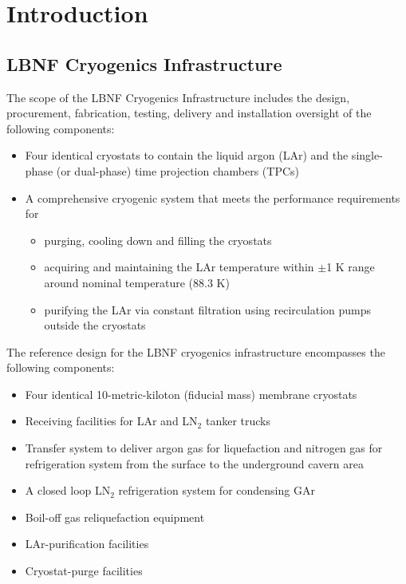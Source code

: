 \chapter{Introduction}
\label{ch:cryo-intro}

\section{LBNF Cryogenics Infrastructure}
\label{sec:cryo-intro-fd}

The scope of the LBNF Cryogenics Infrastructure includes the design, 
procurement, fabrication, testing, delivery and installation
oversight of the following components:
\begin{itemize}
 \item {Four identical cryostats to contain the liquid argon (LAr) 
       and the single-phase (or dual-phase) time projection chambers (TPCs)} 
 \item {A comprehensive cryogenic system that meets the performance 
       requirements for}
 \begin{itemize} 
  \item {purging, cooling down and filling the cryostats}
  \item {acquiring and maintaining the LAr temperature within 
        $\pm$1 K range around nominal temperature (88.3 K)} 
  \item {purifying the LAr via constant filtration using recirculation pumps
         outside the cryostats}
 \end{itemize}
\end{itemize}

The reference design for the LBNF cryogenics infrastructure 
encompasses the following components:

\begin{itemize}
\item Four identical 10-metric-kiloton (fiducial mass) membrane cryostats 
\item Receiving facilities for LAr and LN$_2$ tanker trucks 
\item Transfer system to deliver argon gas for liquefaction and 
      nitrogen gas for refrigeration system from the
      surface to the underground cavern area
\item A closed loop LN$_2$ refrigeration system for condensing GAr
\item Boil-off gas reliquefaction equipment
\item LAr-purification facilities
\item Cryostat-purge facilities
\end{itemize}


